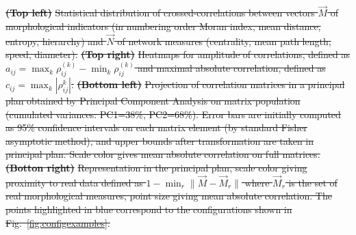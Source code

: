 \documentclass{bmcart}
\newcommand{\norm}[1]{\| #1 \|}
\providecommand{\DIFdeltex}[1]{{\protect\color{red}\sout{#1}}}                      %
\providecommand{\DIFdelFL}[1]{\DIFdel{#1}} %
\providecommand{\DIFdel}[1]{\texorpdfstring{\DIFdeltex{#1}}{}} %
\begin{document}
{%
\textbf{\DIFdelFL{(Top left)}} %
\DIFdelFL{Statistical distribution of crossed-correlations between vectors $\vec{M}$ of morphological indicators (in numbering order Moran index, mean distance, entropy, hierarchy) and $\vec{N}$ of network measures (centrality, mean path length, speed, diameter). }\textbf{\DIFdelFL{(Top right)}} %
\DIFdelFL{Heatmaps for amplitude of correlations, defined as $a_{ij}=\max_k{\rho_{ij}^{(k)}}-\min_k{\rho_{ij}^{(k)}}$ and maximal absolute correlation, defined as $c_{ij}=\max_k\left| \rho_{ij}^{k} \right|$. }\textbf{\DIFdelFL{(Bottom left)}} %
\DIFdelFL{Projection of correlation matrices in a principal plan obtained by Principal Component Analysis on matrix population (cumulated variances: PC1=38\%, PC2=68\%). Error bars are initially computed as 95\% confidence intervals on each matrix element (by standard Fisher asymptotic method), and upper bounds after transformation are taken in principal plan. Scale color gives mean absolute correlation on full matrices. }\textbf{\DIFdelFL{(Botton right)}} %
\DIFdelFL{Representation in the principal plan, scale color giving proximity to real data defined as $1 - \min_r \norm{\vec{M}-\vec{M}_r}$ where $\vec{M}_r$ is the set of real morphological measures, point size giving mean absolute correlation. The points highlighted in blue correspond to the configurations shown in Fig.~\ref{fig:configexamples}.}%
}
\end{document}
